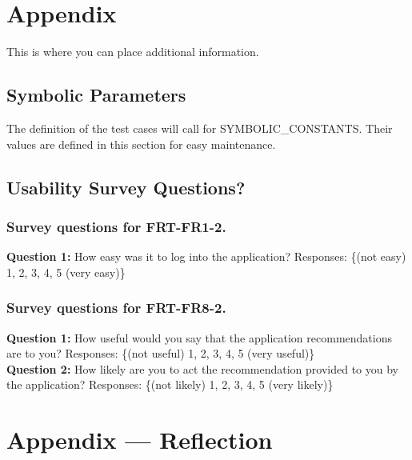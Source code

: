 \documentclass[12pt, titlepage]{article}
\begin{document}
				




\newpage

\section{Appendix}

This is where you can place additional information.

\subsection{Symbolic Parameters}

The definition of the test cases will call for SYMBOLIC\_CONSTANTS.
Their values are defined in this section for easy maintenance.

\subsection{Usability Survey Questions?}


\subsubsection{Survey questions for \textbf{FRT-FR1-2}.}

\noindent \textbf{Question 1:} How easy was it to log into the application?
Responses: \{(not easy) 1, 2, 3, 4, 5 (very easy)\} \\

\subsubsection{Survey questions for \textbf{FRT-FR8-2}.}

\noindent \textbf{Question 1:} How useful would you say that the application recommendations are to you?
Responses: \{(not useful) 1, 2, 3, 4, 5 (very useful)\} \\

\noindent \textbf{Question 2:} How likely are you to act the recommendation provided to you by the application?
Responses: \{(not likely) 1, 2, 3, 4, 5 (very likely)\}

\newpage{}
\section*{Appendix --- Reflection}
\end{document}
